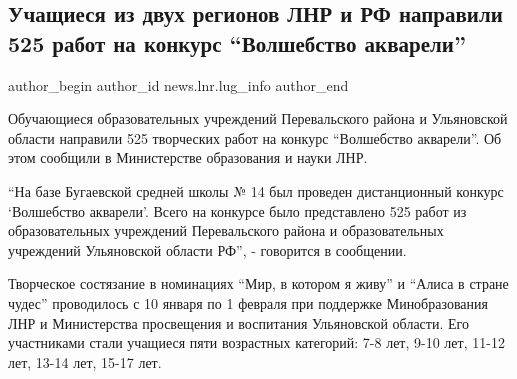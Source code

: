  
 
 
 
 
 
\subsection{Учащиеся из двух регионов ЛНР и РФ направили 525 работ на конкурс \enquote{Волшебство акварели}}
\label{sec:08_02_2022.stz.news.lnr.lug_info.1.konkurs_akvarel}
 
\ifcmt
 author_begin
   author_id news.lnr.lug_info
 author_end
\fi


Обучающиеся образовательных учреждений Перевальского района и Ульяновской
области направили 525 творческих работ на конкурс \enquote{Волшебство акварели}. Об
этом сообщили в Министерстве образования и науки ЛНР.


\enquote{На базе Бугаевской средней школы № 14 был проведен дистанционный конкурс
\enquote{Волшебство акварели}. Всего на конкурсе было представлено 525 работ из
образовательных учреждений Перевальского района и образовательных учреждений
Ульяновской области РФ}, - говорится в сообщении.


Творческое состязание в номинациях \enquote{Мир, в котором я живу} и \enquote{Алиса в стране
чудес} проводилось с 10 января по 1 февраля при поддержке Минобразования ЛНР и
Министерства просвещения и воспитания Ульяновской области. Его участниками
стали учащиеся пяти возрастных категорий: 7-8 лет, 9-10 лет, 11-12 лет, 13-14
лет, 15-17 лет.

